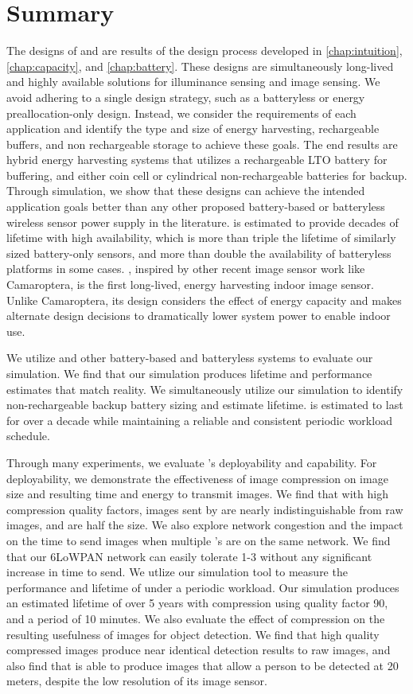 \section{Summary}
The designs of \name and \namec are results of the design process developed in \cref{chap:intuition}, \cref{chap:capacity}, and \cref{chap:battery}. These designs are simultaneously long-lived and highly available solutions for illuminance sensing and image sensing.
We avoid adhering to a single design strategy, such as a batteryless or energy preallocation-only design.
Instead, we consider the requirements of each application and identify the type and size of energy harvesting, rechargeable buffers, and non rechargeable storage to achieve these goals.
The end results are hybrid energy harvesting systems that utilizes a rechargeable LTO battery for buffering, and either coin cell or cylindrical non-rechargeable batteries for backup.
Through simulation, we show that these designs can achieve the intended application goals better than any other proposed battery-based or batteryless wireless sensor power supply in the literature.
\name is estimated to provide decades of lifetime with high availability, which is more than triple the lifetime of similarly sized battery-only sensors, and more than double the availability of batteryless platforms in some cases.
\namec, inspired by other recent image sensor work like Camaroptera, is the first long-lived, energy harvesting indoor image sensor. Unlike Camaroptera, its design considers the effect of energy capacity and makes alternate design decisions to dramatically lower system power to enable indoor use.

We utilize \name and other battery-based and batteryless systems to evaluate our simulation. We find that our simulation produces lifetime and performance estimates that match reality. We simultaneously utilize our simulation to identify non-rechargeable backup battery sizing and estimate lifetime. \name is estimated to last for over a decade while maintaining a reliable and consistent periodic workload schedule.

Through many experiments, we evaluate \namec's deployability and capability. For deployability, we demonstrate the effectiveness of image compression on image size and resulting time and energy to transmit images. 
We find that with high compression quality factors, images sent by \namec are nearly indistinguishable from raw images, and are half the size. 
We also explore network congestion and the impact on the time to send images when multiple \namec{}'s are on the same network. 
We find that our 6LoWPAN network can easily tolerate 1-3 \namecs without any significant increase in time to send. 
We utlize our simulation tool to measure the performance and lifetime of \namec under a periodic workload.
Our simulation produces an estimated lifetime of over 5 years with compression using quality factor 90, and a period of 10 minutes. 
We also evaluate the effect of compression on the resulting usefulness of images for object detection. 
We find that high quality compressed images produce near identical detection results to raw images, and also find that \namec is able to produce images that allow a person to be detected at 20 meters, despite the low resolution of its image sensor.

